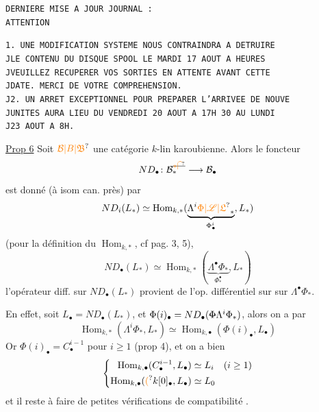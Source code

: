 \texttt{DERNIERE MISE A JOUR  JOURNAL : }\\
\texttt{ATTENTION }

\texttt{\hspace{1em}1. UNE MODIFICATION SYSTEME NOUS CONTRAINDRA A DETRUIRE}\\
\texttt{J\hspace{2em}LE CONTENU DU DISQUE SPOOL LE MARDI 17 AOUT A  HEURES}\\
\texttt{J\hspace{2em}VEUILLEZ RECUPERER VOS SORTIES EN ATTENTE AVANT CETTE}\\
\texttt{J\hspace{2em}DATE. MERCI DE VOTRE COMPREHENSION.}\\
\texttt{J\hspace{1em}2. UN ARRET EXCEPTIONNEL POUR PREPARER L'ARRIVEE DE NOUVE}\\
\texttt{J\hspace{2em}UNITES AURA LIEU DU VENDREDI 20 AOUT A 17H 30 AU LUNDI}\\
\texttt{J\hspace{2em}23 AOUT A 8H.}



\uline{Prop 6} Soit $\unsure{\mathcal B|B|\mathfrak B}$ une catégorie $k$-lin karoubienne. Alors le foncteur
\[
 ND_\bullet\colon\mathcal B_*^{\deleted{\unsure{*|\widehat{\ }}}}\longrightarrow\mathcal B_\bullet
\]
est donné (à isom can. près) par
\[
 ND_i(L_*)\simeq\operatorname{Hom}_{k,*}(\underbrace{\Lambda^i\unsure{\Phi|\mathscr L|\mathfrak L}_*}_{\Phi^i_\bullet},L_*)
\]
(pour la définition du $\operatorname{Hom}_{k,*}$, cf pag. 3, 5),  
\[
 ND_\bullet(L_*)\simeq\operatorname{Hom}_{k,*}(\underbrace{\Lambda^\bullet\Phi_*}_{\Phi^\bullet_*},L_*)
\]
l'opérateur diff. sur $ND_\bullet(L_*)$ provient de l'op. différentiel sur  sur $\Lambda^\bullet\Phi_*$.

En effet,   soit $L_\bullet=ND_\bullet(L_*)$, et  $\Phi(i)_\bullet=ND_\bullet(\deleted{\Phi}\Lambda^i\Phi_*)$, alors on a par 
\[
 \operatorname{Hom}_{k,*}(\Lambda^i\Phi_*,L_*)\simeq\operatorname{Hom}_{k,\bullet}(\Phi(i)_\bullet,L_\bullet)
\]
Or $\Phi(i)_\bullet=C_\bullet^{i-1}$ pour $i\geq1$ (prop 4), et on  a bien
\[
 \left\{\begin{aligned}
 \operatorname{Hom}_{k,\bullet}(C_\bullet^{i-1},L_\bullet)&\simeq L_i\quad(i\geq1)\\
 \operatorname{Hom}_{k,\bullet}(\unsure{(}k[0]_\bullet,L_\bullet)&\simeq L_0
 \end{aligned}\right.
\]
et il reste à faire de petites vérifications de compatibilité .

